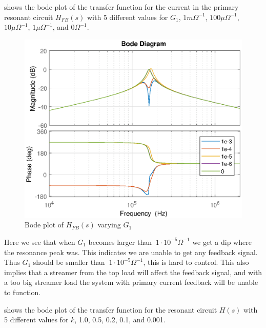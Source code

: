  shows the bode plot of the transfer function for the current in the primary resonant circuit $H_{FB}(s)$ with 5 different values for $G_1$, $1m{\Omega}^{-1}$, $100\mu{\Omega}^{-1}$, $10\mu{\Omega}^{-1}$, $1\mu{\Omega}^{-1}$, and $0{\Omega}^{-1}$.
\begin{figure}[H]
    \centering
    \includegraphics[width=\textwidth]{img/FeedBackBode_G1.eps}
    \caption{Bode plot of $H_{FB}(s)$ varying $G_1$}
    \label{fig:fbbode_g1}
\end{figure}

Here we see that when $G_1$ becomes larger than $~1\cdot10^{-5}{\Omega}^{-1}$ we get a dip where the resonance peak was. This indicates we are unable to get any feedback signal. Thus $G_1$ should be smaller than $~1\cdot10^{-5}{\Omega}^{-1}$, this is hard to control. This also implies that a streamer from the top load will affect the feedback signal, and with a too big streamer load the system with primary current feedback will be unable to function.

\newpage
{} shows the bode plot of the transfer function for the resonant circuit $H(s)$ with 5 different values for $k$, 1.0, 0.5, 0.2, 0.1, and 0.001.

